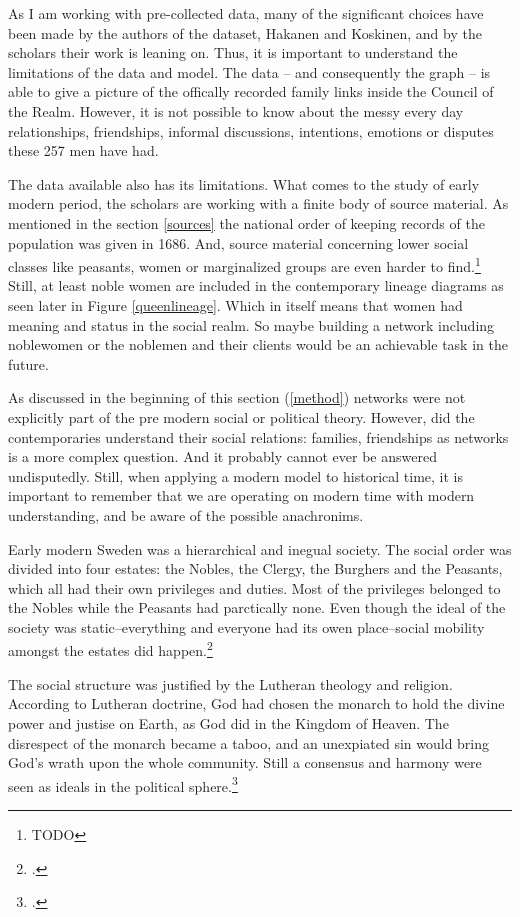 As I am working with pre-collected data, many of the significant choices have been made by the authors of the dataset, Hakanen and Koskinen, and by the scholars their work is leaning on. Thus, it is important to understand the limitations of the data and model. The data – and consequently the graph – is able to give a picture of the offically recorded family links inside the Council of the Realm. However, it is not possible to know about the messy every day relationships, friendships, informal discussions, intentions, emotions or disputes these 257 men have had. 

The data available also has its limitations. What comes to the study of early modern period, the scholars are working with a finite body of source material. As mentioned in the section \ref{sources} the national order of keeping records of the population was given in 1686. And, source material concerning lower social classes like peasants, women or marginalized groups are even harder to find.\footnote{TODO} Still, at least noble women are included in the contemporary lineage diagrams as seen later in Figure \ref{queenlineage}. Which in itself means that women had meaning and status in the social realm. So maybe building a network including noblewomen or the noblemen and their clients would be an achievable task in the future.

As discussed in the beginning of this section (\ref{method}) networks were not explicitly part of the pre modern social or political theory. However, did the contemporaries understand their social relations: families, friendships as networks is a more complex question. And it probably cannot ever be answered undisputedly. Still, when applying a modern model to historical time, it is important to remember that we are operating on modern time with modern understanding, and be aware of the possible anachronims.

Early modern Sweden was a hierarchical and inegual society. The social order was divided into four estates: the Nobles, the Clergy, the Burghers and the Peasants, which all had their own privileges and duties. Most of the privileges belonged to the Nobles while the Peasants had parctically none. Even though the ideal of the society was static–everything and everyone had its owen place–social mobility amongst the estates did happen.\footcites[p. 21-23,]{hopesAndFearsIntro}[p. 21-22.]{agencyAndStateBuilding} 

The social structure was justified by the Lutheran theology and religion. According to Lutheran doctrine, God had chosen the monarch to hold the divine power and justise on Earth, as God did in the Kingdom of Heaven. The disrespect of the monarch became a taboo, and an unexpiated sin would bring God's wrath upon the whole community. Still a consensus and harmony were seen as ideals in the political sphere.\footcites[p. 24-28,]{hopesAndFearsIntro}[p. 161-163.]{pSuurvalta}

